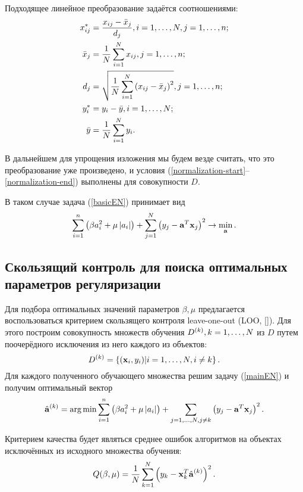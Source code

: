 Подходящее линейное преобразование задаётся соотношениями:
\begin{align*}
	x^*_{ij} 	&= \frac{x_{ij} - \bar x_j}{d_j}, i=1, \ldots, N, j=1, \ldots, n;\\
	\bar x_j 	&= \frac1N\sum\limits_{i=1}^N x_{ij}, j=1, \ldots, n;\\
	d_j 		&= \sqrt{\frac1N\sum\limits_{i=1}^N \left(x_{ij}-\bar x_j\right)^2}, j=1, \ldots, n;\\
	y^*_i 		&= y_i - \bar y, i=1, \ldots, N;\\
	\bar y 		&= \frac1N\sum\limits_{i=1}^N y_i. \\
\end{align*}

В дальнейшем для упрощения изложения мы будем везде считать, что это преобразование уже произведено, и условия (\ref{normalization-start}--\ref{normalization-end}) выполнены для совокупности $D.$

В таком случае задача (\ref{basicEN}) принимает вид
\begin{equation}
	\label{mainEN}
	\sum_{i=1}^n\left(\beta a_i^2 + \mu \left|a_i\right|\right) 
	+ \sum_{j=1}^N\left(y_j - \boldsymbol{\mathbf{a}}^T \boldsymbol{\mathbf{x}}_j\right)^2 
	\to \mathop{\mbox{min}}\limits_{\boldsymbol{\mathbf{a}}}.
\end{equation}

\subsection{Скользящий контроль для поиска оптимальных параметров регуляризации} %
\label{sub:intro:LOO}
Для подбора оптимальных значений параметров $\beta, \mu$ предлагается воспользоваться критерием скользящего контроля leave-one-out (LOO, []).
Для этого построим совокупность множеств обучения $D^{(k)}, k=1, \ldots, N$ из $D$ путем поочерёдного исключения из него каждого из объектов: 
\begin{equation}
	D^{(k)}=\left\{(\boldsymbol{\mathbf{x}}_i, y_i) | i=1, \ldots, N, i\ne k\right\}.
\end{equation}
Для каждого полученного обучающего множества решим задачу (\ref{mainEN}) и получим оптимальный вектор 
\begin{equation*}
	\hat{\boldsymbol{\mathbf{a}}}^{(k)} 
	= \mathop{\mbox{arg\ \!min}}\limits \sum\limits_{i=1}^n\left(\beta a_i^2 + \mu \left|a_i\right|\right) 
	+ \sum\limits_{j=1, \ldots, N, j\ne k}\left(y_j - \boldsymbol{\mathbf{a}}^T \boldsymbol{\mathbf{x}}_j\right)^2.
\end{equation*}

Критерием качества будет являться среднее ошибок алгоритмов на объектах исключённых из исходного множества обучения:
\begin{equation}
	Q(\beta, \mu) = \frac1N\sum\limits_{k=1}^N \left(y_k - \boldsymbol{\mathbf{x}}_k^T\hat{\boldsymbol{\mathbf{a}}}^{(k)}\right)^2.
\end{equation}

